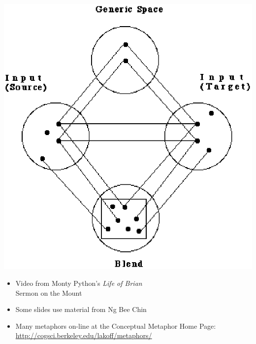 \documentclass[headrule,footrule]{foils}
\begin{document}
\includegraphics[height=\textheight]{pics/blending.eps}


 \begin{itemize}
 \item Video from Monty Python's  \textit{Life of Brian} 
 \\ Sermon on the Mount
  \item Some slides use material from Ng Bee Chin
  \item Many metaphors on-line at the Conceptual Metaphor Home Page:
\\ \url{http://cogsci.berkeley.edu/lakoff/metaphors/}
 \end{itemize}

 
 
\end{document}
